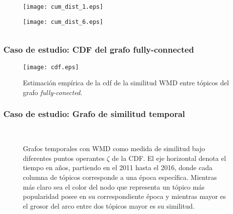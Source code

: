 \documentclass[
	spanish, %
	aspectratio=43, %
	hyperref={pdfencoding=auto,psdextra},
	xcolor={dvipsnames,table,usenames},
]{beamer}
\begin{document}
\begin{frame}[t]
\begin{columns}[t]
\begin{column}{0.5\textwidth}
\begin{figure}
\texttt{[image: cum\_dist\_1.eps]}
\end{figure}

\begin{figure}
\texttt{[image: cum\_dist\_6.eps]}
\end{figure}
\end{column}
\end{columns}

\end{frame}


\begin{frame}[t]
\frametitle{Caso de estudio: CDF del grafo fully-connected}

\begin{figure}
\texttt{[image: cdf.eps]}
\caption{Estimación empírica de la cdf de la similitud WMD entre tópicos del grafo \textit{fully-conected}.}
\label{img:cdf_wmd}
\end{figure}

\end{frame}


\begin{frame}[t]
\frametitle{Caso de estudio: Grafo de similitud temporal}

\vspace*{-0.2in}
\begin{figure}
\\
\caption{Grafos temporales con WMD como medida de similitud bajo diferentes puntos operantes $\zeta$ de la CDF. El eje horizontal denota el tiempo en años, partiendo en el 2011 hasta el 2016, donde cada columna de tópicos corresponde a una época específica. Mientras más claro sea el color del nodo que representa un tópico más popularidad posee en su correspondiente época y mientras mayor es el grosor del arco entre dos tópicos mayor es su similitud.}
\label{img:temporal_similarity_graphs}
\end{figure}

\end{frame}
\end{document}
